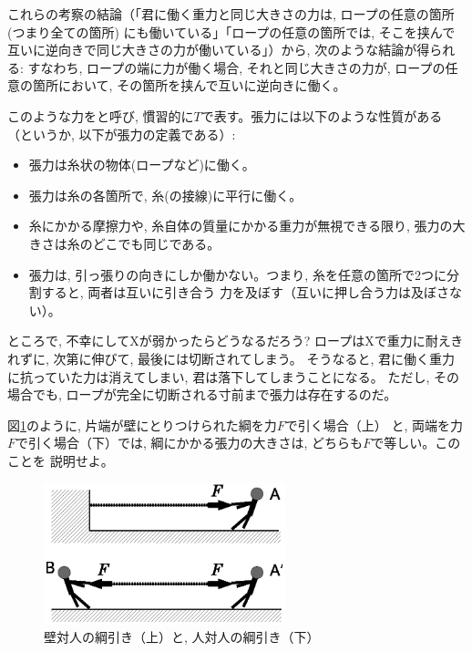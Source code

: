 これらの考察の結論（「君に働く重力と同じ大きさの力は, ロープの任意の箇所(つまり全ての箇所)
にも働いている」「ロープの任意の箇所では, そこを挟んで互いに逆向きで同じ大きさの力が働いている」）から, 
次のような結論が得られる: すなわち, ロープの端に力が働く場合, それと同じ大きさの力が, 
ロープの任意の箇所において, その箇所を挟んで互いに逆向きに働く。

このような力をと呼び, 慣習的に$T$で表す。張力には以下のような性質がある
（というか, 以下が張力の定義である）:
\begin{itemize}
\item 張力は糸状の物体(ロープなど)に働く。
\item 張力は糸の各箇所で, 糸(の接線)に平行に働く。
\item 糸にかかる摩擦力や, 糸自体の質量にかかる重力が無視できる限り, 張力の大きさは糸のどこでも同じである。
\item 張力は, 引っ張りの向きにしか働かない。つまり, 糸を任意の箇所で2つに分割すると, 両者は互いに引き合う
力を及ぼす（互いに押し合う力は及ぼさない）。
\end{itemize}

ところで, 不幸にしてXが弱かったらどうなるだろう? ロープはXで重力に耐えきれずに, 次第に伸びて, 最後には切断されてしまう。
そうなると, 君に働く重力に抗っていた力は消えてしまい, 君は落下してしまうことになる。
ただし, その場合でも, ロープが完全に切断される寸前まで張力は存在するのだ。

\begin{q}\label{q:force_rope1}
図\ref{fig:string2}のように, 片端が壁にとりつけられた綱を力$F$で引く場合（上）
と, 両端を力$F$で引く場合（下）では, 綱にかかる張力の大きさは, どちらも$F$で等しい。このことを
説明せよ。
\begin{figure}[h]
    \centering
    \includegraphics[width=7cm]{string2.eps}
    \caption{壁対人の綱引き（上）と, 人対人の綱引き（下）}\label{fig:string2}
\end{figure}
\end{q}

